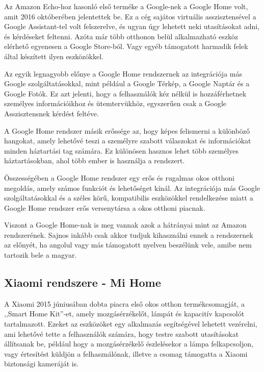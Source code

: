 \documentclass[
]{thesis-ekf}
\theoremstyle{definition}
\theoremstyle{remark}
\begin{document}
	Az Amazon Echo-hoz hasonló első terméke a Google-nek a Google Home volt, amit 2016 októberében jelentettek be. Ez a cég sajátos virtuális asszisztensével a Google Assistant-tel volt felszerelve, és ugyan úgy lehetett neki utasításokat adni, és kérdéseket feltenni. Azóta már több otthonon belül alkalmazható eszköz elérhető egyenesen a Google Store-ból. Vagy egyéb támogatott harmadik felek által készített ilyen eszközökkel.
	
	Az egyik legnagyobb előnye a Google Home rendszernek az integrációja más Google szolgáltatásokkal, mint például a Google Térkép, a Google Naptár és a Google Fotók. Ez azt jelenti, hogy a felhasználók kéz nélkül is hozzáférhetnek személyes információikhoz és ütemtervükhöz, egyszerűen csak a Google Asszisztensnek kérdést feltéve.
	
	A Google Home rendszer másik erőssége az, hogy képes felismerni a különböző hangokat, amely lehetővé teszi a személyre szabott válaszokat és információkat minden háztartási tag számára. Ez különösen hasznos lehet több személyes háztartásokban, ahol több ember is használja a rendszert.
	
	Összességében a Google Home rendszer egy erős és rugalmas okos otthoni megoldás, amely számos funkciót és lehetőséget kínál. Az integrációja más Google szolgáltatásokkal és a széles körű, kompatibilis eszközökkel rendelkezése miatt a Google Home rendszer erős versenytársa a okos otthoni piacnak.
	
	Viszont a Google Home-nak is meg vannak azok a hátrányai mint az Amazon rendszerének. Sajnos inkább csak akkor tudjuk kihasználni ennek a rendszernek az előnyét, ha angolul vagy más támogatott nyelven beszélünk vele, amibe nem tartozik bele a magyar.
	
	\subsection*{Xiaomi rendszere - Mi Home}
	
	A Xiaomi 2015 júniusában dobta piacra első okos otthon termékcsomagját, a ,,Smart Home Kit''-et, amely mozgásérzékelőt, lámpát és kapacitív kapcsolót tartalmazott. Ezeket az eszközöket egy alkalmazás segítségével lehetett vezérelni, ami lehetővé tette a felhasználók számára, hogy testre szabott utasításokat állítsanak be, például hogy a mozgásérzékelő észlelésekor a lámpa felkapcsoljon, vagy értesítést küldjön a felhasználónak, illetve a csomag támogatta a Xiaomi biztonsági kameráját is. \cite{xiaomi-home}
	
\end{document}
